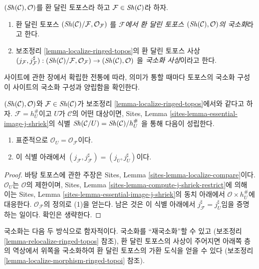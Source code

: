 \begin{definition}
\label{definition-localize-ringed-topos}
$(\mathop{\mathit{Sh}}\nolimits(\mathcal{C}), \mathcal{O})$를 환 달린 토포스라 하고
$\mathcal{F} \in \mathop{\mathit{Sh}}\nolimits(\mathcal{C})$라 하자.
\begin{enumerate}
\item 환 달린 토포스
$(\mathop{\mathit{Sh}}\nolimits(\mathcal{C})/\mathcal{F}, \mathcal{O}_\mathcal{F})$
를 {\it $\mathcal{F}$에서 환 달린 토포스
$(\mathop{\mathit{Sh}}\nolimits(\mathcal{C}), \mathcal{O})$의 국소화}라고 한다.
\item 보조정리 \ref{lemma-localize-ringed-topos}의 환 달린 토포스 사상
$(j_\mathcal{F}, j_\mathcal{F}^\sharp) :
(\mathop{\mathit{Sh}}\nolimits(\mathcal{C})/\mathcal{F}, \mathcal{O}_\mathcal{F})
\to
(\mathop{\mathit{Sh}}\nolimits(\mathcal{C}), \mathcal{O})$
을 {\it 국소화 사상}이라고 한다.
\end{enumerate}
\end{definition}

\noindent
사이트에 관한 장에서 확립한 전통에 따라, 의미가 통할 때마다 토포스의
국소화 구성이 사이트의 국소화 구성과 양립함을 확인한다.

\begin{lemma}
\label{lemma-localize-compare}
$(\mathop{\mathit{Sh}}\nolimits(\mathcal{C}), \mathcal{O})$와
$\mathcal{F} \in \mathop{\mathit{Sh}}\nolimits(\mathcal{C})$가 보조정리
\ref{lemma-localize-ringed-topos}에서와 같다고 하자.
$\mathcal{F} = h_U^\#$이고 $U$가 $\mathcal{C}$의 어떤 대상이면,
Sites, Lemma \ref{sites-lemma-essential-image-j-shriek}의 식별
$\mathop{\mathit{Sh}}\nolimits(\mathcal{C}/U) = \mathop{\mathit{Sh}}\nolimits(\mathcal{C})/h_U^\#$
을 통해 다음이 성립한다.
\begin{enumerate}
\item 표준적으로 $\mathcal{O}_U = \mathcal{O}_\mathcal{F}$이다.
\item 이 식별 아래에서
$(j_\mathcal{F}, j_\mathcal{F}^\sharp) = (j_U, j_U^\sharp)$이다.
\end{enumerate}
\end{lemma}

\begin{proof}
바탕 토포스에 관한 주장은 Sites, Lemma
\ref{sites-lemma-localize-compare}이다. $\mathcal{O}_U$는
$\mathcal{O}$의 제한이며, Sites, Lemma
\ref{sites-lemma-compute-j-shriek-restrict}에 의해 이는 Sites, Lemma
\ref{sites-lemma-essential-image-j-shriek}의 동치 아래에서
$\mathcal{O} \times h_U^\#$에 대응한다. $\mathcal{O}_\mathcal{F}$의 정의로
(1)을 얻는다. 남은 것은 이 식별 아래에서
$j_\mathcal{F}^\sharp = j_U^\sharp$임을 증명하는 일이다. 확인은 생략한다.
\end{proof}

\noindent
국소화는 다음 두 방식으로 함자적이다. 국소화를 ``재국소화''할 수 있고
(보조정리 \ref{lemma-relocalize-ringed-topos} 참조), 환 달린 토포스의
사상이 주어지면 아래쪽 층의 역상에서 위쪽을 국소화하여 환 달린
토포스의 가환 도식을 얻을 수 있다
(보조정리 \ref{lemma-localize-morphism-ringed-topoi} 참조).

